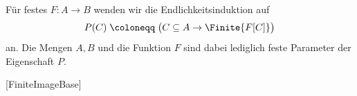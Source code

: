 \documentclass[main.tex]{subfiles}
\begin{document}
Für festes \(F\colon A\to B\) wenden wir die Endlichkeitsinduktion auf
\[
  P(C)\;\coloneqq\;\bigl(C\subseteq A\rightarrow\Finite{F[C]}\bigr)
\]
an. Die Mengen \(A,B\) und die Funktion \(F\) sind dabei lediglich feste
Parameter der Eigenschaft \(P\).
\begin{tabproofsplitwide}
  [FiniteImageBase]
  \closeproofpartwideindR


\end{tabproofsplitwide}
\end{document}
